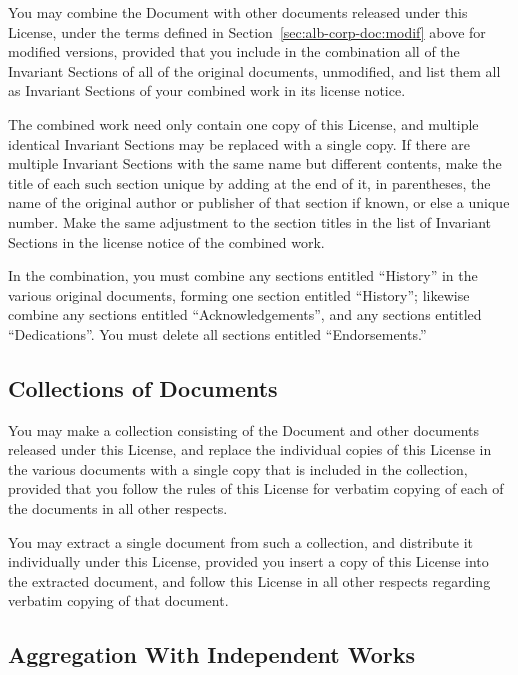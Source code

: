 \documentclass[11pt,letter,oneside]{article}
\begin{document}
\begin{albTitlePage}
You may combine the Document with other documents released under this
License, under the terms defined in Section~\ref{sec:alb-corp-doc:modif}
above for modified versions, provided that you include in the
combination all of the Invariant Sections of all of the original
documents, unmodified, and list them all as Invariant Sections of your
combined work in its license notice.

The combined work need only contain one copy of this License, and
multiple identical Invariant Sections may be replaced with a single
copy.  If there are multiple Invariant Sections with the same name but
different contents, make the title of each such section unique by adding
at the end of it, in parentheses, the name of the original author or
publisher of that section if known, or else a unique number.  Make the
same adjustment to the section titles in the list of Invariant Sections
in the license notice of the combined work.

In the combination, you must combine any sections entitled ``History''
in the various original documents, forming one section entitled
``History''; likewise combine any sections entitled
``Acknowledgements'', and any sections entitled ``Dedications''.  You
must delete all sections entitled ``Endorsements.''


\subsection{Collections of Documents}
\label{sec:alb-corp-doc:coll-docum}

You may make a collection consisting of the Document and other documents
released under this License, and replace the individual copies of this
License in the various documents with a single copy that is included in
the collection, provided that you follow the rules of this License for
verbatim copying of each of the documents in all other respects.

You may extract a single document from such a collection, and distribute
it individually under this License, provided you insert a copy of this
License into the extracted document, and follow this License in all
other respects regarding verbatim copying of that document.


\subsection{Aggregation With Independent Works}
\label{sec:alb-corp-doc:aggr-with-indep-works}


\end{albTitlePage}
\end{document}
